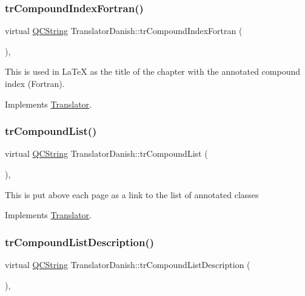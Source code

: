 \subsubsection{\texorpdfstring{trCompoundIndexFortran()}{trCompoundIndexFortran()}}
{\footnotesize\ttfamily virtual \mbox{\hyperlink{class_q_c_string}{Q\+C\+String}} Translator\+Danish\+::tr\+Compound\+Index\+Fortran (\begin{DoxyParamCaption}{ }\end{DoxyParamCaption})\hspace{0.3cm}{\ttfamily [inline]}, {\ttfamily [virtual]}}

This is used in La\+TeX as the title of the chapter with the annotated compound index (Fortran). 

Implements \mbox{\hyperlink{class_translator}{Translator}}.

\mbox{\label{class_translator_danish_a384b0e20781089797caa5a03e4905db8}} 
\subsubsection{\texorpdfstring{trCompoundList()}{trCompoundList()}}
{\footnotesize\ttfamily virtual \mbox{\hyperlink{class_q_c_string}{Q\+C\+String}} Translator\+Danish\+::tr\+Compound\+List (\begin{DoxyParamCaption}{ }\end{DoxyParamCaption})\hspace{0.3cm}{\ttfamily [inline]}, {\ttfamily [virtual]}}

This is put above each page as a link to the list of annotated classes 

Implements \mbox{\hyperlink{class_translator}{Translator}}.

\mbox{\label{class_translator_danish_a8803ad79c15b0490b4637720750a961d}} 
\subsubsection{\texorpdfstring{trCompoundListDescription()}{trCompoundListDescription()}}
{\footnotesize\ttfamily virtual \mbox{\hyperlink{class_q_c_string}{Q\+C\+String}} Translator\+Danish\+::tr\+Compound\+List\+Description (\begin{DoxyParamCaption}{ }\end{DoxyParamCaption})\hspace{0.3cm}{\ttfamily [inline]}, {\ttfamily [virtual]}}

